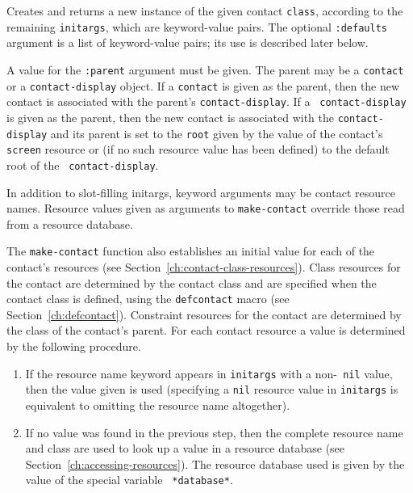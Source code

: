 \documentclass[twoside]{book}
\begin{document}
\begin{sloppy}
\begin{flushright}
{}\end{flushright}


\begin{flushright}
\parbox[t]{6.125in}{
Creates and returns a new
instance of the given contact {\tt class}, according to the remaining
{\tt initargs}, 
which are keyword-value pairs. The optional {\tt :defaults} argument is a list
of keyword-value pairs; its use is described later below.}

\parbox[t]{6.125in}{
A value for the {\tt :parent} argument must be
given. The parent may be a {\tt contact} or a {\tt contact-display} object.
If a  {\tt contact} is given as the parent, then the new contact is associated
with the parent's {\tt contact-display}. If a {\tt
contact-display}  is given as the parent, then the new contact is associated
with the {\tt contact-display} and its parent is set to the {\tt root} 
given by the value of the contact's {\tt screen} resource or (if no such
resource value has been defined) to the default root of the {\tt
contact-display}.
}

\parbox[t]{6.125in}{
In addition to slot-filling initargs, keyword arguments may be contact resource
names. Resource values given as arguments to {\tt make-contact} override
those read from a resource database.

}

\parbox[t]{6.125in}{
The {\tt make-contact} function also establishes an initial value for each of the
contact's resources (see Section~\ref{ch:contact-class-resources}). 
Class resources for the contact are determined by the
contact class and are specified when the contact class is defined, using the
{\tt defcontact} macro
(see Section~\ref{ch:defcontact}). Constraint resources for the contact
are determined by the class of the contact's parent. 
For each contact resource 
a value is determined by the following procedure.

\begin{enumerate}
\item If the resource name keyword appears in {\tt initargs} with a
non-{\tt
nil} value, then the value given is used (specifying a {\tt nil} resource value
in {\tt initargs} is equivalent to omitting the resource name altogether).

\item If no value was found in the previous step, then  the complete resource
name and
class are used to look up a value in a resource database
 (see Section~\ref{ch:accessing-resources}). 
The resource database used is given by the value of the special variable {\tt
*database*}.


\end{enumerate}}
\end{flushright}
\end{sloppy}
\end{document}
